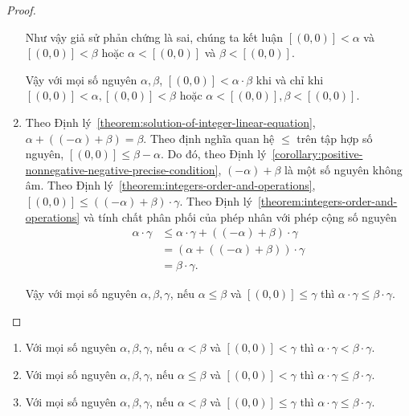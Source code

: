 \begin{proof}
\begin{enumerate}[label={(\roman*)}]
		      Như vậy giả sử phản chứng là sai, chúng ta kết luận $[(0,0)] < \alpha$ và $[(0,0)] < \beta$ hoặc $\alpha < [(0,0)]$ và $\beta < [(0,0)]$.

		      Vậy với mọi số nguyên $\alpha, \beta$, $[(0,0)] < \alpha\cdot \beta$ khi và chỉ khi $[(0,0)] < \alpha, [(0,0)] < \beta$ hoặc $\alpha < [(0,0)], \beta < [(0,0)]$.
		\item Theo Định lý~\ref{theorem:solution-of-integer-linear-equation}, $\alpha + ((-\alpha) + \beta) = \beta$. Theo định nghĩa quan hệ $\leq$ trên tập hợp số nguyên, $[(0,0)] \leq \beta - \alpha$. Do đó, theo Định lý~\ref{corollary:positive-nonnegative-negative-precise-condition}, $(-\alpha) + \beta$ là một số nguyên không âm. Theo Định lý~\ref{theorem:integers-order-and-operations}, $[(0,0)]\leq ((-\alpha) + \beta)\cdot\gamma$. Theo Định lý~\ref{theorem:integers-order-and-operations} và tính chất phân phối của phép nhân với phép cộng số nguyên
		      \begin{align*}
			      \alpha\cdot\gamma & \leq \alpha\cdot\gamma + ((-\alpha) + \beta)\cdot\gamma \\
			                        & = (\alpha + ((-\alpha) + \beta))\cdot\gamma             \\
			                        & = \beta\cdot\gamma.
		      \end{align*}

		      Vậy với mọi số nguyên $\alpha, \beta, \gamma$, nếu $\alpha\leq\beta$ và $[(0,0)]\leq\gamma$ thì $\alpha\cdot\gamma \leq \beta\cdot\gamma$.
	\end{enumerate}
\end{proof}

\begin{corollary}\label{corollary:integers-order-and-multiplication}
	\begin{enumerate}[label={(\roman*)}]
		\item Với mọi số nguyên $\alpha, \beta, \gamma$, nếu $\alpha < \beta$ và $[(0,0)] < \gamma$ thì $\alpha\cdot\gamma < \beta\cdot\gamma$.
		\item Với mọi số nguyên $\alpha, \beta, \gamma$, nếu $\alpha \leq \beta$ và $[(0,0)] < \gamma$ thì $\alpha\cdot\gamma \leq \beta\cdot\gamma$.
		\item Với mọi số nguyên $\alpha, \beta, \gamma$, nếu $\alpha < \beta$ và $[(0,0)] \leq \gamma$ thì $\alpha\cdot\gamma \leq \beta\cdot\gamma$.
	\end{enumerate}
\end{corollary}

